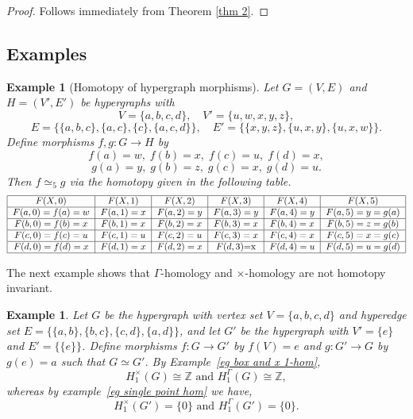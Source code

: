 \documentclass[10pt,a4paper]{amsart}
\newtheorem{ex}[subsection]{Example}
\begin{document}
\begin{proof}
	Follows immediately from Theorem \ref{thm 2}.
\end{proof}


\subsection{Examples}

\begin{ex}[Homotopy of hypergraph morphisms]
Let $G=(V,E)$ and $H=(V',E')$ be hypergraphs with
\[
V=\{a,b,c,d\}, \quad V'=\{u,w,x,y,z\},
\]
\[
E=\{\{a,b,c\},\{a,c\},\{c\},\{a,c,d\}\}, \quad
E'=\{\{x,y,z\},\{u,x,y\},\{u,x,w\}\}.
\]
Define morphisms $f,g:G\to H$ by
\[
f(a)=w,\; f(b)=x,\; f(c)=u,\; f(d)=x,
\]
\[
g(a)=y,\; g(b)=z,\; g(c)=x,\; g(d)=u.
\]
Then $f\simeq_5 g$ via the homotopy given in the following table.
	{\fontsize{8.5pt}{10pt}\selectfont
    \[ \begin{tabular}{|c|c|c|c|c|c|}
		\hline
		$F(X,0)$& $F(X,1)$ & $F(X,2)$ & $F(X,3)$ & $F(X,4)$ & $F(X,5)$ \\
		\hline
		$F(a,0)=f(a)=w$&  $F(a,1)=x$ & $F(a,2)=y$& $F(a,3)= y$  & $F(a,4)= y$ &  $F(a,5)= y=g(a)$\\
		\hline
		$F(b,0)=f(b)=x$&  $F(b,1)=x$ & $F(b,2)=x$ & $F(b,3)=x$ & $F(b,4)=x $  & $F(b,5)= z=g(b)$ \\
		\hline
		$F(c,0)=f(c)=u$ & $F(c,1)=u$ & $F(c,2)=u$ & $F(c,3)=x$ & $F(c,4)= x$ & $F(c,5)=x=g(c)$ \\
		\hline
		$F(d,0)=f(d)=x$& $F(d,1)=x$ & $F(d,2)=x$ & $F(d,3)$=x & $F(d,4)=u$ & $F(d,5)=u=g(d)$ \\
		\hline
	\end{tabular}
	\]}

\end{ex}


The next example shows that $\Gamma$-homology and $\times$-homology are not homotopy invariant.
\\
\begin{ex}\label{eg not homotopy invariant}
Let $G$ be the hypergraph with vertex set $V=\{a,b,c,d\}$ and hyperedge set $E=\{\{a,b\},\{b,c\},\{c,d\},\{a,d\}\}$, and let $G'$ be the hypergraph with $V'=\{e\}$ and $E'=\{\{e\}\}$. Define morphisms $f:G\to G'$ by $f(V)=e$ and $g:G'\to G$ by $g(e)=a$ such that $G\simeq G'$. By Example~\ref{eg box and x 1-hom}, \[H_1^\times(G)\cong \mathbb{Z} \text{ and } H_1^\Gamma(G)\cong \mathbb{Z},\] whereas by example~\ref{eg single point hom} we have,
\[H_1^\times(G')=\{0\} \text{ and } H_1^\Gamma(G')=\{0\}.\]
\end{ex}
\end{document}
